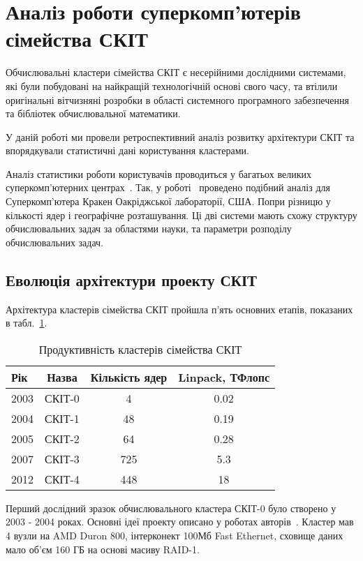\section{Аналіз роботи суперкомп'ютерів сімейства СКІТ}

Обчислювальні кластери сімейства СКІТ є несерійними дослідними системами, які були побудовані на найкращій технологічній основі свого часу, та втілили оригінальні вітчизняні розробки в області системного програмного забезпечення та бібліотек обчислювальної математики.

У даній роботі ми провели ретроспективний аналіз розвитку архітектури СКІТ та впорядкували статистичні дані користування кластерами.

Аналіз статистики роботи користувачів проводиться у багатьох великих суперкомп’ютерних центрах~\cite{haozhang,scit10anniv}. Так, у роботі~\cite{haozhang} проведено подібний  аналіз для Суперкомп’ютера Кракен Оакріджської лабораторії, США. Попри різницю у кількості ядер і географічне розташування. Ці дві системи мають схожу структуру обчислювальних задач за областями науки, та параметри розподілу обчислювальних задач.

\subsection{Еволюція архітектури проекту СКІТ}

Архітектура кластерів сімейства СКІТ пройшла п'ять основних етапів, показаних в табл.~\ref{tab:scit}.

\begin{table}[htb]
  \begin{center}
    \caption{Продуктивність кластерів сімейства СКІТ}
    \begin{tabular}{|l|c|c|c|}
      \hline
Рік & Назва & Кількість ядер & Linpack, ТФлопс \\
\hline
2003 & СКІТ-0 & 4   & 0.02 \\
2004 & СКІТ-1 & 48  & 0.19 \\
2005 & СКІТ-2 & 64  & 0.28 \\
2007 & СКІТ-3 & 725 & 5.3 \\
2012 & СКІТ-4 & 448 & 18 \\
\hline
    \end{tabular}
    \label{tab:scit}
  \end{center}
\end{table}


Перший дослідний зразок обчислювального кластера СКІТ-0 було створено у 2003 - 2004 роках. Основні ідеї проекту описано у роботах авторів~\cite{scit-project-art}. Кластер мав 4 вузли на AMD Duron 800, інтерконект 100Мб Fast Ethernet, сховище даних мало об'єм 160 ГБ на основі масиву RAID-1.

